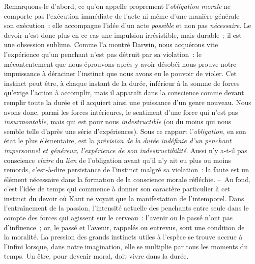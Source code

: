 \documentclass[french,twoside]{book} %
\begin{document}
Remarquons-le d’abord, ce qu’on appelle proprement l’\emph{obligation morale} ne comporte pas l’exécution immédiate de l’acte ni même d’une manière générale son exécution : elle accompagne l’idée d’un acte \emph{possible} et non pas \emph{nécessaire}. Le devoir n’est donc plus en ce cas une impulsion irrésistible, mais durable ; il est une obsession sublime. Comme l’a montré Darwin, nous acquérons vite l’expérience qu’un penchant n’est pas détruit par sa violation : le mécontentement que nous éprouvons après y avoir désobéi nous prouve notre impuissance à déraciner l’instinct que nous avons eu le pouvoir de violer. Cet instinct peut être, à chaque instant de la durée, inférieur à la somme de forces qu’exige l’action à accomplir, mais il apparaît dans la conscience comme devant remplir toute la durée et il acquiert ainsi une puissance d’un genre nouveau. Nous avons donc, parmi les forces intérieures, le sentiment d’une force qui n’est pas \emph{insurmontable}, mais qui est pour nous \emph{indestructible} (ou du moins qui nous semble telle d’après une série d’expériences). Sous ce rapport l’\emph{obligation}, en son état le plus élémentaire, est la \emph{prévision de la durée indéfinie d’un penchant impersonnel et généreux, l’expérience de son indestructibilité}. Aussi n’y a-t-il pas conscience \emph{claire} du \emph{lien} de l’obligation avant qu’il n’y ait eu plus ou moins remords, c’est-à-dire persistance de l’instinct malgré sa violation : la faute est un élément nécessaire dans la formation de la conscience morale réfléchie. – Au fond, c’est l’idée de temps qui commence à donner son caractère particulier à cet instinct du devoir où Kant ne voyait que la manifestation de l’intemporel. Dans l’entraînement de la passion, l’intensité actuelle des penchants entre seule dans le compte des forces qui agissent sur le cerveau : l’avenir ou le passé n’ont pas d’influence ; or, le passé et l’avenir, rappelés ou entrevus, sont une condition de la moralité. La pression des grands instincts utiles à l’espèce se trouve accrue à l’infini lorsque, dans notre imagination, elle se multiplie par tous les moments du temps. Un être, pour devenir moral, doit vivre dans la durée.\par
\end{document}
